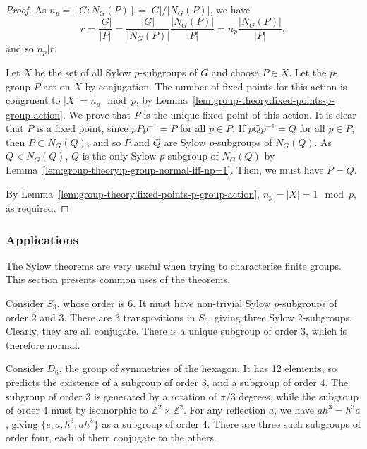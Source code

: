 \begin{proof}
  As \(n_{p} = [G : N_{G}(P)] = |G|/|N_{G}(P)|\), we have
  \[r = \frac{|G|}{|P|} = \frac{|G|}{|N_{G}(P)|} \frac{|N_{G}(P)|}{|P|} = n_{p}\frac{|N_{G}(P)|}{|P|},\]
  and so \(n_{p} | r\).

  Let \(X\) be the set of all Sylow \(p\)-subgroups of \(G\) and choose \(P \in X\). Let the \(p\)-group \(P\) act on \(X\) by conjugation. The number of fixed points for this action is congruent to \(|X| = n_{p} \mod p\), by Lemma~\ref{lem:group-theory:fixed-points-p-group-action}. We prove that \(P\) is the unique fixed point of this action.
  It is clear that \(P\) is a fixed point, since \(pPp^{-1} = P\) for all \(p \in P\). If \(pQp^{-1} = Q\) for all \(p \in P\), then \(P \subset N_{G}(Q)\), and so \(P\) and \(Q\) are Sylow \(p\)-subgroups of \(N_{G}(Q)\). As \(Q \triangleleft N_{G}(Q)\), \(Q\) is the only Sylow \(p\)-subgroup of \(N_{G}(Q)\) by Lemma~\ref{lem:group-theory:p-group-normal-iff-np=1}. Then, we must have \(P = Q\).

  By Lemma~\ref{lem:group-theory:fixed-points-p-group-action}, \(n_{p} = |X| = 1 \mod p\), as required.
\end{proof}


\subsubsection{Applications}
The Sylow theorems are very useful when trying to characterise finite groups. This section presents common uses of the theorems.

\begin{example}
  Consider \(S_{3}\), whose order is 6. It must have non-trivial Sylow \(p\)-subgroups of order 2 and 3. There are 3 transpositions in \(S_{3}\), giving three Sylow 2-subgroups. Clearly, they are all conjugate.
  There is a unique subgroup of order 3, which is therefore normal.
\end{example}

\begin{example}
  Consider \(D_{6}\), the group of symmetries of the hexagon. It has 12 elements, so  predicts the existence of a subgroup of order 3, and a subgroup of order 4. The subgroup of order 3 is generated by a rotation of \(\pi / 3\) degrees, while the subgroup of order 4 must by isomorphic to \(\mathbb Z^{2} \times \mathbb Z^{2}\). For any reflection \(a\), we have \(ah^{3} = h^{3} a\), giving \(\{e, a, h^{3}, ah^{3}\}\) as a subgroup of order 4. There are three such subgroups of order four, each of them conjugate to the others.
\end{example}

